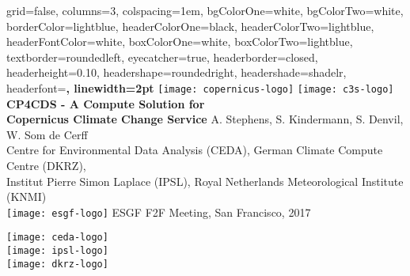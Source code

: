 \documentclass[portrait,a0paper,fontscale=0.4]{baposter} %
\begin{document}


\begin{poster}%
  {
  grid=false,
  columns=3,
  colspacing=1em,
  bgColorOne=white, %
  bgColorTwo=white, %
  borderColor=lightblue, %
  headerColorOne=black, %
  headerColorTwo=lightblue, %
  headerFontColor=white, %
  boxColorOne=white, %
  boxColorTwo=lightblue,
  textborder=roundedleft,
  eyecatcher=true, %
  headerborder=closed, %
  headerheight=0.10\textheight, %
  headershape=roundedright, %
  headershade=shadelr,
  headerfont=\Large\bf\textsc, %
  linewidth=2pt
  }
  {
      \texttt{[image: copernicus-logo]}
      \texttt{[image: c3s-logo]}
  }
  {\sf\bf
          CP4CDS - A Compute Solution for\\ Copernicus Climate Change Service
  }
  {
    \vspace{1em} A. Stephens, S. Kindermann, S. Denvil, W. Som de Cerff\\
    {\smaller Centre for Environmental Data Analysis (CEDA),
    German Climate Compute Centre (DKRZ),\\
    Institut Pierre Simon Laplace (IPSL),
    Royal Netherlands Meteorological Institute (KNMI)\\[1em]
    \texttt{[image: esgf-logo]} ESGF F2F Meeting, San Francisco, 2017}
  }
  {
    \begin{minipage}{10em}
      \texttt{[image: ceda-logo]} \\
      \texttt{[image: ipsl-logo]} \\
      \texttt{[image: dkrz-logo]}
    \end{minipage}
  }


\end{poster}
\end{document}
